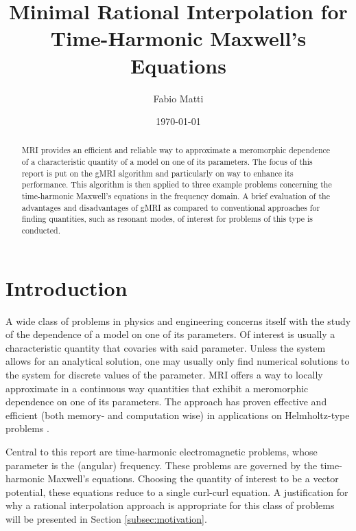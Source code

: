 \documentclass[11pt, a4paper]{article}
\title{Minimal Rational Interpolation for Time-Harmonic Maxwell's Equations}
\author{Fabio Matti}
\date{\today}
\begin{document}
\maketitle

\begin{abstract}
    \acrfull{MRI} provides an efficient and reliable way to approximate
    a meromorphic dependence of a characteristic quantity of a model on one
    of its parameters.
    The focus of this report is put on the \acrfull{gMRI} algorithm and particularly
    on way to enhance its performance. This algorithm is then applied to three 
    example problems concerning the time-harmonic Maxwell's equations in the 
    frequency domain. A brief evaluation of the advantages and disadvantages of
    \acrshort{gMRI} as compared to conventional approaches for finding quantities,
    such as resonant modes, of interest for problems of this type is conducted.
\end{abstract}


\newpage
\tableofcontents

\newpage
\section{Introduction}
\label{sec:introduction}

A wide class of problems in physics and engineering concerns itself with the
study of the dependence of a model on one of its parameters. 
Of interest is usually a characteristic quantity that covaries with said parameter.
Unless the system allows for an analytical solution, one may usually only
find numerical solutions to the system for discrete values of the parameter.
\acrfull{MRI} offers a way to locally approximate in a continuous way
quantities that exhibit a meromorphic dependence on one of its 
parameters. The approach has proven
effective and efficient (both memory- and computation wise) in applications
on Helmholtz-type problems \cite{greedyMRI, shortMRI}.

Central to this report are time-harmonic electromagnetic problems, whose 
parameter is the (angular) frequency. These problems are governed by
the time-harmonic Maxwell's equations. Choosing the quantity of interest
to be a vector potential, these equations reduce to a single curl-curl equation.
A justification for why a rational interpolation approach is appropriate for
this class of problems will be presented in Section \ref{subsec:motivation}.
\end{document}
